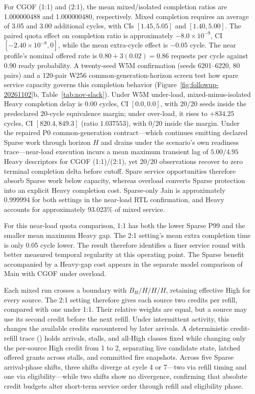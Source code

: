 For CGOF (1:1) and (2:1), the mean mixed/isolated completion ratios are 1.000000488 and 1.000000480, respectively. Mixed completion requires an average of 3.05 and 3.00 additional cycles, with CIs $[1.45,5.05]$ and $[1.40,5.00]$. The paired quota effect on completion ratio is approximately $-8.0\times10^{-9}$, CI $[-2.40\times10^{-8},0]$, while the mean extra-cycle effect is $-0.05$ cycle. The near profile's nominal offered rate is $0.80+3(0.02)=0.86$ requests per cycle against 0.90 ready probability. A twenty-seed W5M  confirmation (seeds 6201--6220, 80 pairs) and a 120-pair W256 common-generation-horizon screen test how spare service capacity governs this completion behavior (Figure~\ref{fig:followup-20261102}b, Table~\ref{tab:nov-slack}). Under W5M under-load, mixed-minus-isolated Heavy completion delay is $0.00$ cycles, CI $[0.0,0.0]$, with 20/20 seeds inside the predeclared 20-cycle equivalence margin; under over-load, it rises to $+834.25$ cycles, CI $[820.4,849.3]$ (ratio $1.037553$), with 0/20 inside the margin. Under the repaired P0 common-generation contract—which continues emitting declared Sparse work through horizon $H$ and drains under the scenario's own readiness trace—near-load execution incurs a mean maximum transient lag of $5.00/4.95$ Heavy descriptors for CGOF (1:1)/(2:1), yet 20/20 observations recover to zero terminal completion delta before cutoff. Spare service opportunities therefore absorb Sparse work below capacity, whereas overload converts Sparse protection into an explicit Heavy completion cost. Sparse-only Jain is approximately 0.999994 for both settings in the near-load RTL confirmation, and Heavy accounts for approximately 93.023\% of mixed service.

For this near-load quota comparison, 1:1 has both the lower Sparse P99 and the smaller mean maximum Heavy gap. The 2:1 setting's mean extra completion time is only 0.05 cycle lower. The result therefore identifies a finer service round with better measured temporal regularity at this operating point. The Sparse benefit accompanied by a Heavy-gap cost appears in the separate model comparison of Main with CGOF under overload.

Each mixed run crosses a boundary with $B_H/H/H/H$, retaining effective High for every source. The 2:1 setting therefore gives each source two credits per refill, compared with one under 1:1. Their relative weights are equal, but a source may use its second credit before the next refill. Under intermittent activity, this changes the available credits encountered by later arrivals. A deterministic  credit-refill trace () holds arrivals, stalls, and all-High classes fixed while changing only the per-source High credit from 1 to 2, separating live candidate state, latched offered grants across stalls, and committed fire snapshots. Across five Sparse arrival-phase shifts, three shifts diverge at cycle 4 or 7—two via refill timing and one via eligibility—while two shifts show no divergence, confirming that absolute credit budgets alter short-term service order through refill and eligibility phase.

